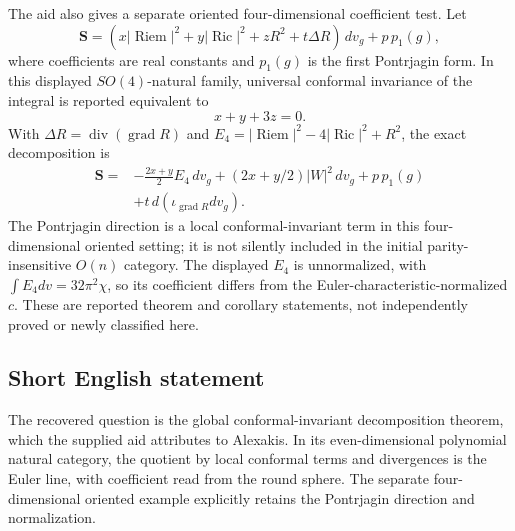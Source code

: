 \documentclass[11pt]{article}
\begin{document}
The aid also gives a separate oriented four-dimensional coefficient test. Let
\[
 \mathbf S=(x|\operatorname{Riem}|^2+y|\operatorname{Ric}|^2
                 +zR^2+t\Delta R)\,dv_g+p\,p_1(g),
\]
where coefficients are real constants and \(p_1(g)\) is the first Pontrjagin form. In this displayed \(SO(4)\)-natural family, universal conformal invariance of the integral is reported equivalent to
\[
 x+y+3z=0.
\]
With \(\Delta R=\operatorname{div}(\operatorname{grad}R)\) and
\(E_4=|\operatorname{Riem}|^2-4|\operatorname{Ric}|^2+R^2\), the exact decomposition is
\[
 \begin{split}
 \mathbf S={}&-\frac{2x+y}{2}E_4\,dv_g
 +(2x+y/2)|W|^2\,dv_g+p\,p_1(g)\\
 &+t\,d(\iota_{\operatorname{grad}R}dv_g).
 \end{split}
\]
The Pontrjagin direction is a local conformal-invariant term in this four-dimensional oriented setting; it is not silently included in the initial parity-insensitive \(O(n)\) category. The displayed \(E_4\) is unnormalized, with \(\int E_4dv=32\pi^2\chi\), so its coefficient differs from the Euler-characteristic-normalized \(c\). These are reported theorem and corollary statements, not independently proved or newly classified here.
\subsection{Short English statement}
The recovered question is the global conformal-invariant decomposition theorem, which the supplied aid attributes to Alexakis. In its even-dimensional polynomial natural category, the quotient by local conformal terms and divergences is the Euler line, with coefficient read from the round sphere. The separate four-dimensional oriented example explicitly retains the Pontrjagin direction and normalization.
\end{document}

